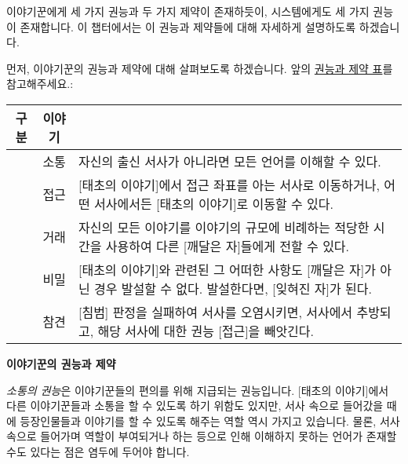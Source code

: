 \documentclass{report}
\begin{document}
	이야기꾼에게 세 가지 권능과 두 가지 제약이 존재하듯이, 시스템에게도 세 가지 권능이 존재합니다. 이 챕터에서는 이 권능과 제약들에 대해 자세하게 설명하도록 하겠습니다.
	
	\bigskip
	
	먼저, 이야기꾼의 권능과 제약에 대해 살펴보도록 하겠습니다\ifprintout. 앞의 \hyperlink{power-limit-table}{권능과 제약 표}를 참고해주세요.\else:
	
	\smallskip
	
	\begin{minipage}{\textwidth}
		\begin{tabularx}{\textwidth}{c!{\color{black}\vrule}c!{\color{black}\vrule}X}
			\hline
			\textbf{구분} & \textbf{이야기} &  \\ \hline \hline
			[권능] & 소통 & 자신의 출신 서사가 아니라면 모든 언어를 이해할 수 있다. \\ \hline
			[권능] & 접근 & [태초의 이야기]에서 접근 좌표를 아는 서사로 이동하거나, 어떤 서사에서든 [태초의 이야기]로 이동할 수 있다. \\ \hline
			[권능] & 거래 & 자신의 모든 이야기를 이야기의 규모에 비례하는 적당한 시간을 사용하여 다른 [깨달은 자]들에게 전할 수 있다. \\ \hline
			[제약] & 비밀 & [태초의 이야기]와 관련된 그 어떠한 사항도 [깨달은 자]가 아닌 경우 발설할 수 없다. 발설한다면, [잊혀진 자]가 된다. \\ \hline
			[제약] & 참견 & [침범] 판정을 실패하여 서사를 오염시키면, 서사에서 추방되고, 해당 서사에 대한 권능 [접근]을 빼앗긴다. \\\hline
		\end{tabularx}
		
		\smallskip
		
		\begin{tightcenter}
			\textbf{이야기꾼의 권능과 제약}
		\end{tightcenter}
	\end{minipage}
	
	\bigskip
	\fi
	
	\emph{소통의 권능}은 이야기꾼들의 편의를 위해 지급되는 권능입니다. [태초의 이야기]에서 다른 이야기꾼들과 소통을 할 수 있도록 하기 위함도 있지만, 서사 속으로 들어갔을 때에 등장인물들과 이야기를 할 수 있도록 해주는 역할 역시 가지고 있습니다. 물론, 서사 속으로 들어가며 역할이 부여되거나 하는 등으로 인해 이해하지 못하는 언어가 존재할 수도 있다는 점은 염두에 두어야 합니다.
	
	\smallskip
	
\end{document}

